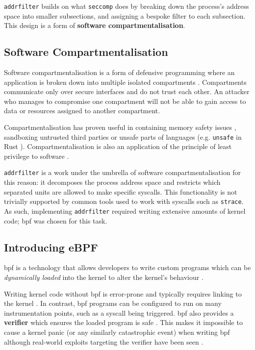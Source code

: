 \texttt{addrfilter} builds on what \texttt{seccomp} does by breaking down the
process's address space into smaller subsections, and assigning a bespoke filter
to each subsection. This design is a form of \textbf{software
compartmentalisation}. 

\subsection{Software Compartmentalisation}

Software compartmentalisation is a form of defensive programming where an
application is broken down into multiple isolated compartments \cite{SOK}. Compartments
communicate only over secure interfaces and do not trust each other. An attacker
who manages to compromise one compartment will not be able to gain access to
data or resources assigned to another compartment. 

Compartmentalisation has proven useful in containing memory safety issues
\cite{CONFFUZZ},
sandboxing untrusted third parties \cite{ANDROID_SOK} or unsafe parts of
languages \cite{MPK} (e.g.
\texttt{unsafe} in Rust \cite{rustbook_unsafe}). Compartmentalisation is also an
application of the principle of least privilege to software \cite{PRIVMAN}.

\texttt{addrfilter} is a work under the umbrella of software
compartmentalisation for this reason: it decomposes the process address space
and restricts which separated units are allowed to make specific syscalls.
This functionality is not trivially supported by common tools used to work with
syscalls such as \texttt{strace}. As such, implementing \texttt{addrfilter}
required writing extensive amounts of kernel code; \ac{bpf} was chosen for this
task.

\subsection{Introducing eBPF}

\ac{bpf} is a technology that allows developers to write custom programs which
can be \textit{dynamically loaded} into the kernel to alter the kernel's
behaviour \cite{LEARNING_EBPF}. 

Writing kernel code without \ac{bpf} is error-prone and typically
requires linking to the kernel \cite{UNDERSTANDING_LINUX_KERNEL}. In contrast,
\ac{bpf} programs can be configured to run on many instrumentation points, such
as a syscall being triggered. \ac{bpf} also provides a \textbf{verifier} which ensures the  loaded program is safe \cite{LEARNING_EBPF}.
This makes it impossible to cause a kernel panic (or any similarly
catastrophic event) when writing \ac{bpf} although real-world exploits targeting the
verifier have been seen \cite{BPF_VERIFIER_EXPLOIT}. 


